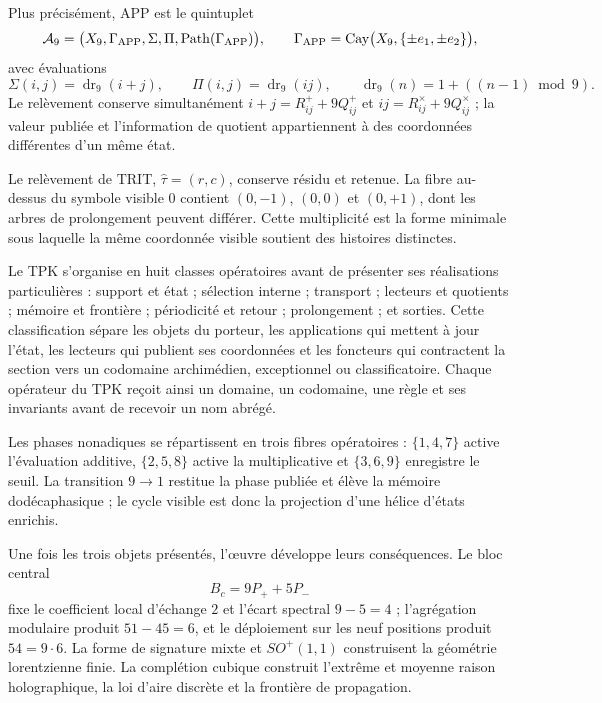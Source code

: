 Plus précisément, APP est le quintuplet
\[
 \mathcal A_9=
 \bigl(X_9,\Gamma_{\rm APP},\Sigma,\Pi,
       \operatorname{Path}(\Gamma_{\rm APP})\bigr),
 \qquad
 \Gamma_{\rm APP}=\operatorname{Cay}
 \bigl(X_9,\{\pm e_1,\pm e_2\}\bigr),
\]
avec évaluations
\[
 \Sigma(i,j)=\operatorname{dr}_9(i+j),\qquad
 \Pi(i,j)=\operatorname{dr}_9(ij),
 \qquad
 \operatorname{dr}_9(n)=1+((n-1)\bmod9).
\]
Le relèvement conserve simultanément
\(i+j=R^+_{ij}+9Q^+_{ij}\) et
\(ij=R^\times_{ij}+9Q^\times_{ij}\) ; la valeur publiée et l'information
de quotient appartiennent à des coordonnées différentes d'un même état.

Le relèvement de TRIT, \(\widehat\tau=(r,c)\), conserve résidu et retenue. La fibre
au-dessus du symbole visible \(0\) contient \((0,-1)\), \((0,0)\) et
\((0,+1)\), dont les arbres de prolongement peuvent différer. Cette multiplicité
est la forme minimale sous laquelle la même coordonnée visible soutient des histoires
distinctes.

Le TPK s'organise en huit classes opératoires avant de présenter ses
réalisations particulières : support et état ; sélection interne ; transport ;
lecteurs et quotients ; mémoire et frontière ; périodicité et retour ;
prolongement ; et sorties. Cette classification sépare les objets du porteur,
les applications qui mettent à jour l'état, les lecteurs qui publient ses coordonnées
et les foncteurs qui contractent la section vers un codomaine archimédien,
exceptionnel ou classificatoire. Chaque opérateur du TPK reçoit ainsi un domaine, un
codomaine, une règle et ses invariants avant de recevoir un nom abrégé.

Les phases nonadiques se répartissent en trois fibres opératoires :
\(\{1,4,7\}\) active l'évaluation additive, \(\{2,5,8\}\) active
la multiplicative et \(\{3,6,9\}\) enregistre le seuil. La transition
\(9\to1\) restitue la phase publiée et élève la mémoire dodécaphasique ; le
cycle visible est donc la projection d'une hélice d'états
enrichis.

Une fois les trois objets présentés, l'œuvre développe leurs conséquences.
Le bloc central
\[
 B_c=9P_++5P_-
\]
fixe le coefficient local d'échange \(2\) et l'écart spectral
\(9-5=4\) ; l'agrégation modulaire produit \(51-45=6\), et le déploiement sur
les neuf positions produit \(54=9\cdot6\). La forme de signature mixte et
\(SO^+(1,1)\) construisent la géométrie lorentzienne finie. La complétion
cubique construit l'extrême et moyenne raison holographique, la loi d'aire
discrète et la frontière de propagation.


